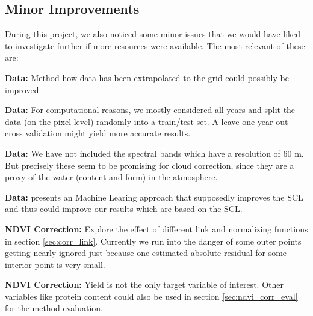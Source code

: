 {    \subsection{Minor Improvements}
        During this project, we also noticed some minor issues that we would have liked to investigate further if more resources were available. The most relevant of these are:
        \begin{Nitemize}
            \item \textbf{Data:}
            Method how data has been extrapolated to the grid could possibly be improved
            \item \textbf{Data:}
            For computational reasons, we mostly considered all years and split the data (on the pixel level) randomly into a train/test set. A leave one year out cross validation might yield more accurate results.
            \item \textbf{Data:}
            We have not included the spectral bands which have a resolution of 60 m. But precisely these seem to be promising for cloud correction, since they are a proxy of the water (content and form) in the atmosphere.
            \item \textbf{Data:}
            \cite{raiyaniSentinel2ImageScene2021} presents an Machine Learing approach that supposedly improves the SCL and thus could improve our results which are based on the SCL.
            \item \textbf{NDVI Correction:}
            Explore the effect of different link and normalizing functions %
            in section \ref{sec:corr_link}. Currently we run into the danger of some outer points getting nearly ignored just because one estimated absolute residual for some interior point is very small.
            \item \textbf{NDVI Correction:}
            Yield is not the only target variable of interest. Other variables like protein content could also be used in section \ref{sec:ndvi_corr_eval} for the method evaluation. 
        \end{Nitemize}
}


